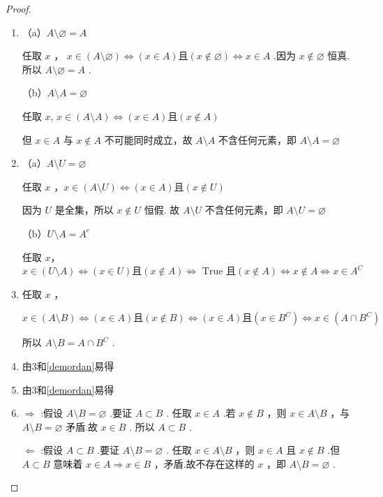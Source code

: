 \begin{proof}
	\begin{enumerate}
		\item （a）$A\setminus\varnothing=A$
		
		任取 $x$ ， $x \in(A\setminus\varnothing) \Longleftrightarrow(x \in A) \textbf{且}(x \notin \varnothing) \Longleftrightarrow x \in A$ .因为 $x \notin \varnothing$ 恒真.
		所以 $A\setminus \varnothing=A$ .
		
		（b）$A\setminus A=\varnothing$
		
		任取 $x$,
		$
		x \in(A\setminus A) \Longleftrightarrow(x \in A) \textbf{且}(x \notin A) 
		$
		
		
		但 $x \in A$ 与 $x \notin A$ 不可能同时成立，故 $A\setminus A$ 不含任何元素，即 $A\setminus A=\varnothing$ 
		
		\item（a）$A\setminus U=\varnothing$
		
		任取 $x$ ，$x \in(A\setminus U) \Longleftrightarrow(x \in A) \textbf{且}(x \notin U) $
		
		因为 $U$ 是全集，所以 $x \notin U$ 恒假.
		故 $A\setminus U$ 不含任何元素，即 $A\setminus U=\varnothing$ 
		
		（b）$U\setminus A=A^c$
		
		任取 $x$，$x \in(U\setminus A) \Longleftrightarrow(x \in U) \textbf{且}(x \notin A) \Longleftrightarrow \text { True } \textbf{且}(x \notin A) \Longleftrightarrow x \notin A \Longleftrightarrow x \in A^C$
		\item
		
		任取 $x$ ，
		
		$
		x \in(A\setminus B) \Longleftrightarrow(x \in A) \textbf{且}(x \notin B) \Longleftrightarrow(x \in A) \textbf{且}\left(x \in B^C\right) \Longleftrightarrow x \in\left(A \cap B^C\right)
		$
		
		
		所以 $A\setminus B=A \cap B^C$ .
		\item 由3和\ref{demordan}易得
		
		\item 由3和\ref{demordan}易得
		\item
		 $\Rightarrow$ :假设 $A\setminus B=\varnothing$ .要证 $A \subset B$ .
		任取 $x \in A$ .若 $x \notin B$ ，则 $x \in A\setminus B$ ，与 $A\setminus B=\varnothing$ 矛盾.故 $x \in B$ .
		所以 $A \subset B$ .
		
		$\Leftarrow$ :假设 $A \subset B$ .要证 $A\setminus B=\varnothing$ .
		任取 $x \in A\setminus B$ ，则 $x \in A$ 且 $x \notin B$ .但 $A \subset B$ 意味着 $x \in A \Rightarrow x \in B$ ，矛盾.故不存在这样的 $x$ ，即 $A\setminus B=\varnothing$ .
		

\end{enumerate}
\end{proof}
